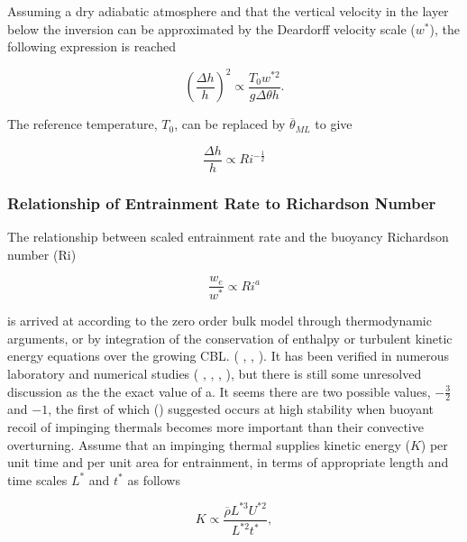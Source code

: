 Assuming a dry adiabatic atmosphere and that the vertical velocity in the layer below the inversion can be approximated by the Deardorff velocity scale ($w^{*}$), the following expression is reached

\begin{equation}
\left(\frac{\Delta h}{h}\right)^{2} \propto \frac{T_{0} w^{*2}}{g \Delta \theta h}.
\end{equation}

The reference temperature, $T_{0}$, can be replaced by $\overline{\theta}_{ML}$ to give

\begin{equation}
\frac{\Delta h}{h} \propto Ri^{-\frac{1}{2}}
\end{equation}
\subsubsection{Relationship of Entrainment Rate to Richardson Number}
\label{subsec:erri}
The relationship between scaled entrainment rate and the buoyancy Richardson number (\acs{Ri})

\begin{equation}\label{eq:ervsri}
\frac{w_{e}}{w^{*}} \propto Ri^{a}
\end{equation}

is arrived at according to the zero order bulk model through thermodynamic arguments, or by integration of the conservation of enthalpy or turbulent kinetic energy equations over the growing \acs{CBL}. (\citeauthor{Tennekes73} \citeyear{Tennekes73}, \citeauthor{Deardorff79} \citeyear{Deardorff79}, \citeauthor{FedConzMir04} \citeyear{FedConzMir04}). It has been verified in numerous laboratory and numerical studies (\citeauthor{DearWill80} \citeyear{DearWill80}, \citeauthor{SullMoengStev} \citeyear{SullMoengStev}, \citeauthor{FedConzMir04} \citeyear{FedConzMir04}, \citeauthor{BrooksFowler2} \citeyear{BrooksFowler2}), but there is still some 
unresolved discussion as the the exact value of a.  It seems there are two possible values, $-\frac{3}{2}$ and $-1$, the first of which \citeauthor{Turner86} (\citeyear{Turner86}) suggested occurs at high stability when buoyant recoil of impinging thermals becomes more important than their convective overturning. Assume that an impinging thermal supplies kinetic energy ($K$) per unit time and per unit area for entrainment, in terms of appropriate length and time scales $L^{*}$ and $t^{*}$ as follows 

\begin{equation}
K \propto \frac{\overline{\rho} L^{*3} U^{*2}}{L^{*2} t^{*}},
\end{equation}


